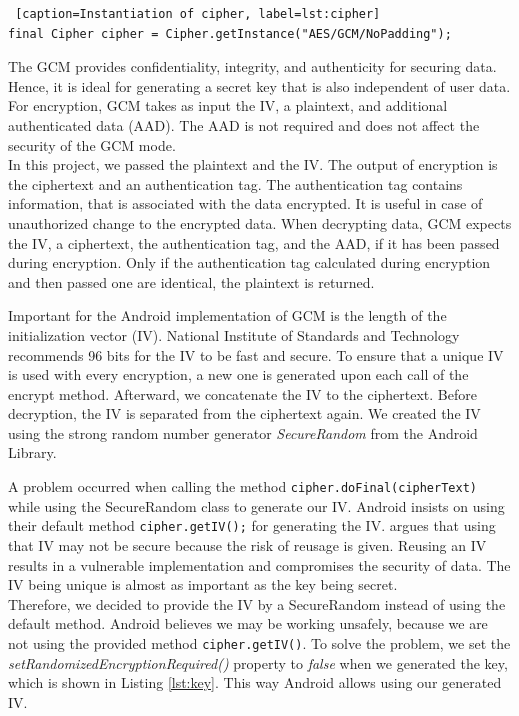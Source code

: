 \begin{lstlisting} [caption=Instantiation of cipher, label=lst:cipher]
final Cipher cipher = Cipher.getInstance("AES/GCM/NoPadding");
\end{lstlisting}

The GCM provides confidentiality, integrity, and authenticity for securing data. \cite{AESJavaAndroid} Hence, it is ideal for generating a secret key that is also independent of user data. For encryption, GCM takes as input the IV, a plaintext, and additional authenticated data (AAD). The AAD is not required and does not affect the security of the GCM mode. \cite{AADsecure} \\
In this project, we passed the plaintext and the IV. The output of encryption is the ciphertext and an authentication tag. \cite{dworkin2007sp} The authentication tag contains information, that is associated with the data encrypted. It is useful in case of unauthorized change to the encrypted data. \cite{AESJavaAndroid} When decrypting data, GCM expects the IV, a ciphertext, the authentication tag, and the AAD, if it has been passed during encryption. Only if the authentication tag calculated during encryption and then passed one are identical, the plaintext is returned. \cite{dworkin2007sp}

Important for the Android implementation of GCM is the length of the initialization vector (IV). National Institute of Standards and Technology recommends 96 bits for the IV to be fast and secure. \cite{dworkin2007sp} To ensure that a unique IV is used with every encryption, a new one is generated upon each call of the encrypt method. Afterward, we concatenate the IV to the ciphertext. Before decryption, the IV is separated from the ciphertext again. We created the IV using the strong random number generator \textit{SecureRandom} from the Android Library. \cite{SecureRandom}

A problem occurred when calling the method \texttt{cipher.doFinal(cipherText)} while using the SecureRandom class to generate our IV. Android insists on using their default method \texttt{cipher.getIV();} for generating the IV. \cite{DefaultIV} argues that using that IV may not be secure because the risk of reusage is given. Reusing an IV results in a vulnerable implementation and compromises the security of data. The IV being unique is almost as important as the key being secret. \cite{dworkin2007sp} \\
Therefore, we decided to provide the IV by a SecureRandom instead of using the default method. Android believes we may be working unsafely, because we are not using the provided method \texttt{cipher.getIV()}. To solve the problem, we set the \textit{setRandomizedEncryptionRequired()} property to \textit{false} when we generated the key, which is shown in Listing \ref{lst:key}. This way Android allows using our generated IV. \cite{SecretsInAndroid}


